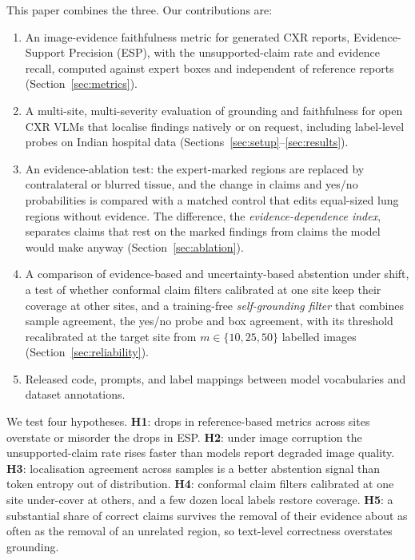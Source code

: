 \documentclass[pdflatex,sn-mathphys-num]{sn-jnl}
\theoremstyle{thmstyleone}
\begin{document}
This paper combines the three. Our contributions are:
\begin{enumerate}
\item An image-evidence faithfulness metric for generated CXR reports, Evidence-Support Precision (ESP), with the unsupported-claim rate and evidence recall, computed against expert boxes and independent of reference reports (Section~\ref{sec:metrics}).
\item A multi-site, multi-severity evaluation of grounding and faithfulness for open CXR VLMs that localise findings natively or on request, including label-level probes on Indian hospital data (Sections~\ref{sec:setup}--\ref{sec:results}).
\item An evidence-ablation test: the expert-marked regions are replaced by contralateral or blurred tissue, and the change in claims and yes/no probabilities is compared with a matched control that edits equal-sized lung regions without evidence. The difference, the \emph{evidence-dependence index}, separates claims that rest on the marked findings from claims the model would make anyway (Section~\ref{sec:ablation}).
\item A comparison of evidence-based and uncertainty-based abstention under shift, a test of whether conformal claim filters calibrated at one site keep their coverage at other sites, and a training-free \emph{self-grounding filter} that combines sample agreement, the yes/no probe and box agreement, with its threshold recalibrated at the target site from $m\in\{10,25,50\}$ labelled images (Section~\ref{sec:reliability}).
\item Released code, prompts, and label mappings between model vocabularies and dataset annotations.
\end{enumerate}

We test four hypotheses. \textbf{H1}: drops in reference-based metrics across sites overstate or misorder the drops in ESP. \textbf{H2}: under image corruption the unsupported-claim rate rises faster than models report degraded image quality. \textbf{H3}: localisation agreement across samples is a better abstention signal than token entropy out of distribution. \textbf{H4}: conformal claim filters calibrated at one site under-cover at others, and a few dozen local labels restore coverage. \textbf{H5}: a substantial share of correct claims survives the removal of their evidence about as often as the removal of an unrelated region, so text-level correctness overstates grounding.

\end{document}

